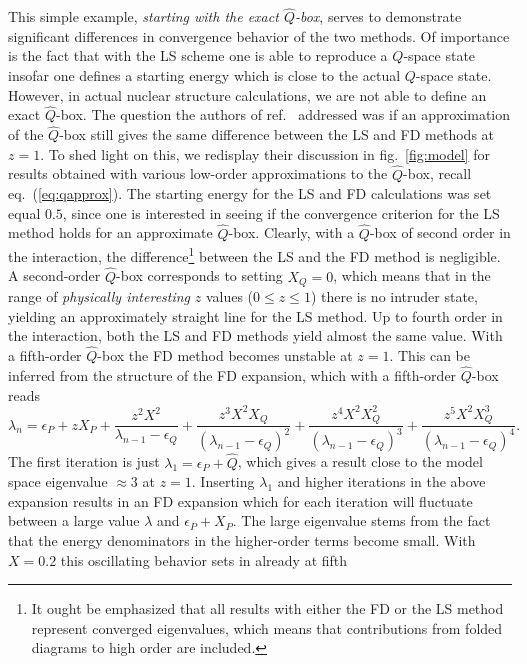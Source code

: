 This simple example, {\em starting with the
exact $\hat{Q}$-box},  serves to demonstrate significant
differences in convergence behavior of the two methods. Of
importance is the fact that with the LS scheme
one is  able to reproduce a
$Q$-space state insofar one defines a starting energy which is
close to the actual $Q$-space state.
However, in actual nuclear structure calculations, we are not
able to define an exact $\hat{Q}$-box. The question the authors of ref.\
\cite{eehho94} addressed 
was if an
approximation of the $\hat{Q}$-box still gives the same
difference between the LS and FD methods at $z=1$.
To shed light on this, we redisplay their discussion  in 
fig.\ \ref{fig:model} for results obtained with various low-order
approximations to the $\hat{Q}$-box, recall eq.\ (\ref{eq:qapprox}).
The starting energy for the LS and 
FD calculations was set equal $0.5$, since
one is interested in seeing if the convergence criterion for the
LS method holds for an approximate $\hat{Q}$-box. 
Clearly, with a $\hat{Q}$-box of second order
in the interaction, the
difference\footnote{It ought be emphasized that all results
with either the FD or the LS method represent converged
eigenvalues, which means that contributions from folded diagrams
to high order are included.}
between the LS and the FD method is negligible. 
A second-order $\hat{Q}$-box corresponds to setting $X_Q=0$, which
means that in the range of {\em physically interesting} 
$z$ values ($0\leq z \leq 1$)
there is no intruder state, yielding an approximately straight line
for the LS method.
Up to fourth order in the interaction, both 
the LS and FD methods yield almost 
the same value. With a fifth-order
$\hat{Q}$-box the FD method becomes unstable at $z=1$.
This can 
be inferred from the structure of the FD expansion, 
which with a fifth-order $\hat{Q}$-box
reads
\[
     \lambda_n=\epsilon_P+zX_P+\frac{z^2X^2}{\lambda_{n-1} -\epsilon_Q}+
      \frac{z^3X^2X_Q}{(\lambda_{n-1} -\epsilon_Q)^2}+
      \frac{z^4X^2X_Q^2}{(\lambda_{n-1} -\epsilon_Q)^3}+
     \frac{z^5X^2X_Q^3}{(\lambda_{n-1} -\epsilon_Q)^4}.
\] 
The first iteration is just $\lambda_1=\epsilon_P+\hat{Q}$, 
which gives a result close to the model space eigenvalue
$\approx 3$ at $z=1$. Inserting $\lambda_1$ and higher iterations
in the above expansion
results in an
FD expansion which for each iteration will fluctuate
between a large value $\lambda$ and $\epsilon_P+X_P$. 
The large eigenvalue stems
from the fact that the energy denominators in the higher-order terms become
small. With $X=0.2$ this oscillating behavior sets in already at fifth 

